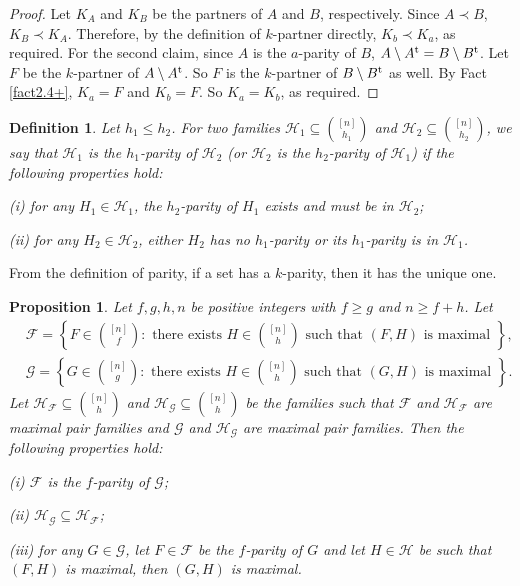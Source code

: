 \documentclass[a4paper,11pt]{article}
\newtheorem{definition}[theorem]{Definition}
\newtheorem{proposition}[theorem]{Proposition}
\begin{document}
\begin{proof}
Let $K_A$ and $K_B$ be the partners of $A$ and $B$, respectively.
Since $A\prec B$, $K_B\prec K_A$. Therefore, by the definition of $k$-partner directly, $K_b\prec K_a$, as required.
For the second claim, since $A$ is the $a$-parity of $B$, $A\setminus A^{\rm t}=B\setminus B^{\rm t}$. Let $F$ be the $k$-partner of $A\setminus A^{\rm t}$. So $F$ is the $k$-partner of $B\setminus B^{\rm t}$ as well. By Fact \ref{fact2.4+}, $K_a=F$ and $K_b=F$. So $K_a=K_b$, as required.
\end{proof}



\begin{definition}\label{def2.7}
Let $h_1\leq h_2$. For two families $\mathcal{H}_1\subseteq {[n]\choose h_1}$ and $\mathcal{H}_2\subseteq {[n]\choose h_2}$, we say that $\mathcal{H}_1$ is the $h_1$-parity of $\mathcal{H}_2$ (or $\mathcal{H}_2$ is the $h_2$-parity of $\mathcal{H}_1$) if
the following properties hold:

(i) for any $H_1\in \mathcal{H}_1$, the $h_2$-parity of $H_1$ exists and must be in $\mathcal{H}_2$;

(ii) for any $H_2\in \mathcal{H}_2$, either $H_2$ has no $h_1$-parity or its $h_1$-parity is in $\mathcal{H}_1$.
\end{definition}

From the definition of parity,
 if a set  has a $k$-parity, then it has the unique one.
\begin{proposition}\label{prop2.9}
Let $f, g, h, n$ be positive integers with $f\geq g$ and $n\geq f+h$. Let
\begin{align*}
&\mathcal{F}=\left\{ F\in{[n]\choose f}: \text{ there exists } H\in {[n]\choose h} \text{ such that } (F, H) \text{ is maximal }  \right\},\\
&\mathcal{G}=\left\{ G\in{[n]\choose g}: \text{ there exists } H\in {[n]\choose h} \text{ such that } (G, H) \text{ is maximal }  \right\}.
\end{align*}
Let $\mathcal{H}_{\mathcal{F}}\subseteq {[n]\choose h}$ and $\mathcal{H}_{\mathcal{G}}\subseteq {[n]\choose h}$ be the families
such that $\mathcal{F}$ and $\mathcal{H}_{\mathcal{F}}$ are maximal pair families and $\mathcal{G}$ and $\mathcal{H}_{\mathcal{G}}$ are  maximal pair families.
Then the following properties hold:

(i) $\mathcal{F}$ is the $f$-parity of $\mathcal{G}$;

(ii) $\mathcal{H}_{\mathcal{G}}\subseteq \mathcal{H}_{\mathcal{F}}$;

(iii) for any $G\in \mathcal{G}$, let $F\in \mathcal{F}$ be the $f$-parity of $G$ and let $H\in \mathcal{H}$ be such that $(F, H)$ is maximal, then $(G, H)$ is maximal.
\end{proposition}
\end{document}

